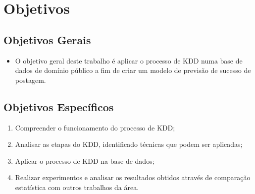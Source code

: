 \section{Objetivos}

\subsection{Objetivos Gerais}
\begin{frame}
	\begin{itemize}
		\item O objetivo geral deste trabalho é aplicar o processo de KDD numa base de dados de domínio público a fim de criar um modelo de previsão de sucesso de postagem.
	\end{itemize}
\end{frame}

\subsection{Objetivos Específicos}
\begin{frame}
	\begin{enumerate}
		\item Compreender o funcionamento do processo de KDD;
		\item Analisar as etapas do KDD, identificado técnicas que podem ser aplicadas;
		\item Aplicar o processo de KDD na base de dados;
		\item Realizar experimentos e analisar os resultados obtidos através de comparação estatística com outros trabalhos da área.
	\end{enumerate}
\end{frame}